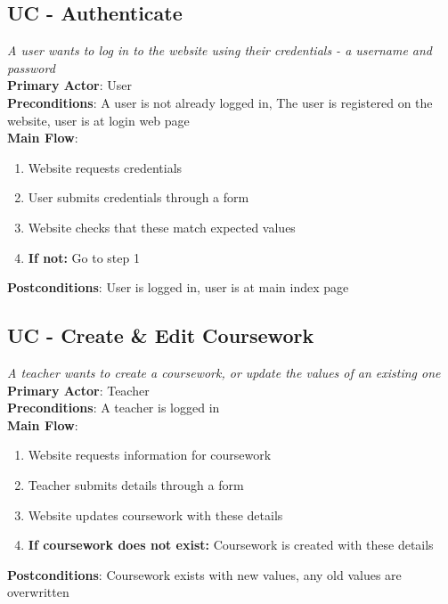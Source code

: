 \documentclass[a4paper,11pt]{report}
\begin{document}
\subsection*{UC - Authenticate}
\textit{A user wants to log in to the website using their credentials - a username and password}\\
\textbf{Primary Actor}: User\\
\textbf{Preconditions}: A user is not already logged in, The user is registered on the website, user is at login web page\\
\textbf{Main Flow}:
\begin{enumerate}
\item Website requests credentials
\item User submits credentials through a form
\item Website checks that these match expected values
\item \textbf{If not:} Go to step 1
\end{enumerate}
\textbf{Postconditions}: User is logged in, user is at main index page

\subsection*{UC - Create \& Edit Coursework}
\textit{A teacher wants to create a coursework, or update the values of an existing one}\\
\textbf{Primary Actor}: Teacher\\
\textbf{Preconditions}: A teacher is logged in\\
\textbf{Main Flow}:
\begin{enumerate}
\item Website requests information for coursework
\item Teacher submits details through a form
\item Website updates coursework with these details
\item \textbf{If coursework does not exist:} Coursework is created with these details
\end{enumerate}
\textbf{Postconditions}: Coursework exists with new values, any old values are overwritten
\end{document}

